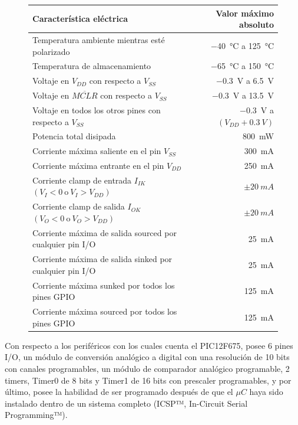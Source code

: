 \begin{figure}[!h]
    \centering
    \begin{tabular}{lr}
          \toprule
          Característica eléctrica& Valor máximo absoluto\\ 
          \midrule
          Temperatura ambiente mientras esté polarizado & \SI{-40}{\degreeCelsius} a \SI{+125}{\degreeCelsius}\\
          Temperatura de almacenamiento & \SI{-65}{\degreeCelsius} a \SI{+150}{\degreeCelsius}\\
          Voltaje en $V_{DD}$ con respecto a $V_{SS}$ & \SI{-0.3}{V} a \SI{+6.5}{V}\\
          Voltaje en $\overline{MCLR}$ con respecto a $V_{SS}$ & \SI{-0.3}{V} a \SI{+13.5}{V}\\
          Voltaje en todos los otros pines con respecto a $V _{SS}$ & \SI{-0.3}{V} a $(V _{DD} + \SI{0.3}{V})$\\
          Potencia total disipada & \SI{800}{mW}\\
          Corriente máxima saliente en el pin $V _{SS}$ & \SI{300}{mA}\\
          Corriente máxima entrante en el pin $V _{DD}$ & \SI{250}{mA}\\
          Corriente clamp de entrada $I _{IK}$ $(V _{I}<0\ \text{o}\ V _{I}>V _{DD})$ & $\pm \SI{20}{mA}$\\
          Corriente clamp de salida $I _{OK}$ $(V _{O}<0\ \text{o}\ V _{O}>V _{DD})$ & $\pm \SI{20}{mA}$\\
          Corriente máxima de salida sourced por cualquier pin I/O & \SI{25}{mA}\\
          Corriente máxima de salida sinked por cualquier pin I/O & \SI{25}{mA}\\
          Corriente máxima sunked por todos los pines GPIO & \SI{125}{mA}\\
          Corriente máxima sourced por todos los pines GPIO & \SI{125}{mA}\\
          \bottomrule
      \end{tabular}
    \label{t1}
\end{figure}

Con respecto a los periféricos con los cuales cuenta el PIC12F675, posee 6 pines I/O, un módulo de conversión analógico a digital con una resolución de 10 bits con canales programables, un módulo de comparador analógico programable, 2 timers, Timer0 de 8 bits y Timer1 de 16 bits con prescaler programables, y por último, posee la habilidad de ser programado después de que el $\mu C$ haya sido instalado dentro de un sistema completo (ICSP™, In-Circuit Serial Programming™).

